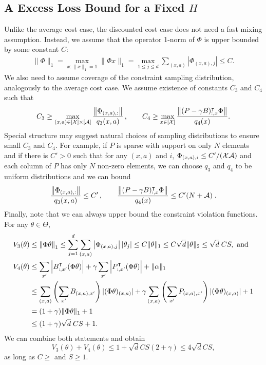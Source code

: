 \documentclass[11pt]{article}
\newcounter{assumption}%
\begin{document}
\subsection{A Excess Loss Bound for a Fixed $H$}
  Unlike the average cost case, the discounted cost case does not need a fast mixing assumption. Instead, we assume that the operator 1-norm of $\Phi$ is upper bounded by some constant $C$:
\begin{eqnarray}
  \|\Phi\|_1= \max_{x: \|x\|_1=1} \|\Phi x\|_1 =\max \limits_{1 \leq j \leq d} \sum _{(x,a)} | \Phi_{(x,a),j} | \leq C.
\end{eqnarray}
We also need to assume coverage of the constraint sampling distribution, analogously to the average cost case. We assume existence of constants $C_3$ and $C_4$ such that
\begin{align*}
C_3 \geq \max_{(x,a)\in [{\cal X}]\times [{\cal A}]}\frac{\left\Vert\Phi_{(x,a),:}\right\Vert}{q_3(x, a)}\,, \qquad C_4 \geq \max_{x\in [{\cal X}]}\frac{\left\Vert(P - \gamma B)_{:,x}^\intercal \Phi\right\Vert}{q_4(x)}.
\end{align*}
Special structure may suggest natural choices of sampling distributions to ensure small $C_3$ and $C_4$. For example, if $P$ is sparse with support on only $N$ elements and if there is $C'>0$ such that for any $(x,a)$ and $i$, $\Phi_{(x,a), i}\le C'/({\cal X} {\cal A})$ and each column of $P$ has only $N$ non-zero elements, we can choose $q_3$ and $q_4$ to be uniform distributions and we can bound
\begin{align*}
\frac{\left\Vert\Phi_{(x,a),:}\right\Vert}{q_3(x, a)} \le C'\,, \qquad \frac{\left\Vert(P - \gamma B)_{:,x}^\intercal \Phi\right\Vert}{q_4(x)} \le C' (N + {\cal A}) \; .
\end{align*}
Finally, note that we can always upper bound the constraint violation functions. For any $\theta \in \Theta$,
\begin{align*}
V_3(\theta) &\le  \left\Vert\Phi \theta\right\Vert_1 \le \sum_{j=1}^d \sum_{(x,a)} \left\vert\Phi_{(x,a),j}\right\vert |\theta_j| \leq C \|\theta\|_1 \leq C \sqrt{d} \|\theta\|_2 \leq \sqrt{d} \; CS, \text{ and }\\
V_4(\theta) &\le  \sum_{x'} \left\vert B_{:,x'}^\intercal (  \Phi \theta) \right\vert +\gamma \sum_{x'} \left\vert P_{:,x'}^\intercal (   \Phi \theta) \right\vert + \|\alpha\|_1 \\
&\le  \sum_{(x,a)} \left(\sum_{x'} B_{(x,a),x'} \right) |(\Phi\theta)_{(x,a)}|   +  \gamma \sum_{(x,a)} \left(\sum_{x'} P_{(x,a),x'} \right) |(\Phi\theta)_{(x,a)}|   + 1  \\
& = (1+\gamma)\|\Phi\theta \|_1 +1 \\
&\le  (1+\gamma) \sqrt{d} \; CS  +1.
\end{align*}
We can combine both statements and obtain
\begin{equation}
\label{eqn:V_bound_discounted}
   V_3(\theta) + V_4(\theta)
   \leq
   1+\sqrt{d}CS(2+\gamma)
   \leq
      4\sqrt{d}CS,
  \end{equation}
as long as $C\geq$ and $S\geq 1$.
\end{document}
